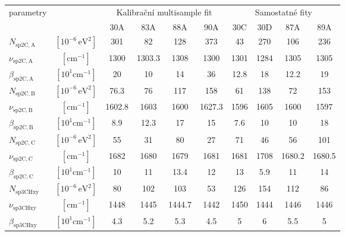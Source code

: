 \begin{tabular}{lccccccccc}
\hline
parametry & & \multicolumn{4}{c}{Kalibrační multisample fit} & \multicolumn{4}{c}{Samostatné fity}\\
 &  & 30A & 83A & 88A & 90A & 30C & 30D & 87A & 89A\\
\hline
$N_\mathrm{sp2C,A}$ & $[10^{-6}\,\mathrm{eV}^2]$ & 301 & 82 & 128 & 373 & 43 & 270 & 106 & 236\\
$\nu_\mathrm{sp2C,A}$ & $[\mathrm{cm}^{-1}]$ & 1300 & 1303.3 & 1308 & 1300 & 1301 & 1284 & 1305 & 1305\\
$\beta_\mathrm{sp2C,A}$ & $[10^1\mathrm{cm}^{-1}]$ & 20 & 10 & 14 & 36 & 12.8 & 18 & 12.2 & 19\\
$N_\mathrm{sp2C,B}$ & $[10^{-6}\,\mathrm{eV}^2]$ & 76.3 & 76 & 117 & 158 & 61 & 138 & 72 & 153\\
$\nu_\mathrm{sp2C,B}$ & $[\mathrm{cm}^{-1}]$ & 1602.8 & 1603 & 1600 & 1627.3 & 1596 & 1605 & 1600 & 1597\\
$\beta_\mathrm{sp2C,B}$ & $[10^1\mathrm{cm}^{-1}]$ & 8.9 & 12.3 & 17 & 15 & 7.6 & 10 & 10 & 18\\
$N_\mathrm{sp2C,C}$ & $[10^{-6}\,\mathrm{eV}^2]$ & 55 & 31 & 80 & 27 & 71 & 46 & 56 & 101\\
$\nu_\mathrm{sp2C,C}$ & $[\mathrm{cm}^{-1}]$ & 1682 & 1680 & 1679 & 1681 & 1681 & 1708 & 1680.2 & 1680.5\\
$\beta_\mathrm{sp2C,C}$ & $[10^1\mathrm{cm}^{-1}]$ & 10 & 11 & 13.4 & 12 & 13 & 5.9 & 11 & 14\\
$N_\mathrm{sp3CHxy}$ & $[10^{-6}\,\mathrm{eV}^2]$ & 80 & 102 & 103 & 53 & 126 & 154 & 112 & 86\\
$\nu_\mathrm{sp3CHxy}$ & $[\mathrm{cm}^{-1}]$ & 1448 & 1445 & 1444.7 & 1442 & 1450 & 1444 & 1446 & 1446\\
$\beta_\mathrm{sp3CHxy}$ & $[10^1\mathrm{cm}^{-1}]$ & 4.3 & 5.2 & 5.3 & 4.5 & 5 & 6 & 5.5 & 5\\
\hline
\end{tabular}

